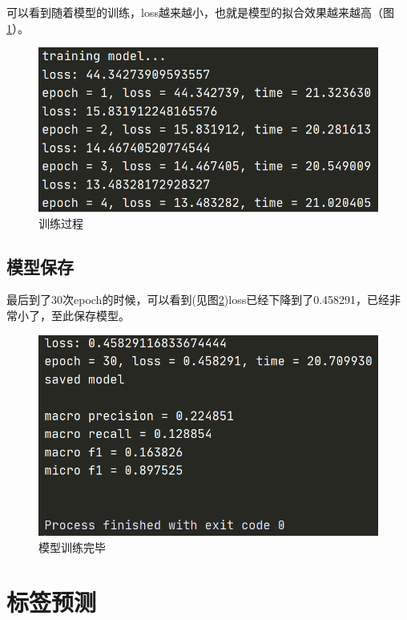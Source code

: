 \documentclass[12pt]{article}
\begin{document}
可以看到随着模型的训练，loss越来越小，也就是模型的拟合效果越来越高（图\ref{aaaaa}）。
\begin{figure}[H]
  \centering
  \includegraphics[scale=0.4]{./picture/loss.png} %
  \caption{训练过程} %
  \label{aaaaa} %
\end{figure}
\subsection{模型保存}
最后到了30次epoch的时候，可以看到(见图\ref{dsfd})loss已经下降到了0.458291，已经非常小了，至此保存模型。
\begin{figure}[H]
  \centering
  \includegraphics[scale=0.4]{./picture/loss2.png} %
  \caption{模型训练完毕} %
  \label{dsfd} %
\end{figure}
\section{标签预测}
\end{document}
